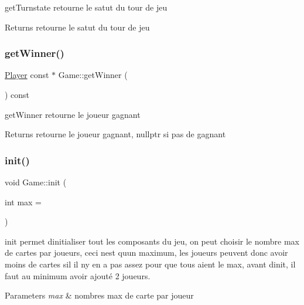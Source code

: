 get\+Turnstate retourne le satut du tour de jeu 

\begin{DoxyReturn}{Returns}
retourne le satut du tour de jeu 
\end{DoxyReturn}
\mbox{\label{class_game_af1698fea8cf96a95427a1c5e363eac37}} 
\subsubsection{\texorpdfstring{getWinner()}{getWinner()}}
{\footnotesize\ttfamily \mbox{\hyperlink{class_player}{Player}} const  $\ast$ Game\+::get\+Winner (\begin{DoxyParamCaption}{ }\end{DoxyParamCaption}) const}



get\+Winner retourne le joueur gagnant 

\begin{DoxyReturn}{Returns}
retourne le joueur gagnant, nullptr si pas de gagnant 
\end{DoxyReturn}
\mbox{\label{class_game_af7453615da19dfb6d9646bf33acccccb}} 
\subsubsection{\texorpdfstring{init()}{init()}}
{\footnotesize\ttfamily void Game\+::init (\begin{DoxyParamCaption}\item[{int}]{max = {} }\end{DoxyParamCaption})}



init permet d\textquotesingle{}initialiser tout les composants du jeu, on peut choisir le nombre max de cartes par joueurs, ceci n\textquotesingle{}est qu\textquotesingle{}un maximum, les joueurs peuvent donc avoir moins de cartes s\textquotesingle{}il il n\textquotesingle{}y en a pas assez pour que tous aient le max, avant d\textquotesingle{}init, il faut au minimum avoir ajouté 2 joueurs. 


\begin{DoxyParams}{Parameters}
{\em max} & nombres max de carte par joueur \\
\hline
\end{DoxyParams}
\mbox{\label{class_game_a2e527b9d67d6f70a1b911a8e4fca77e4}} 
